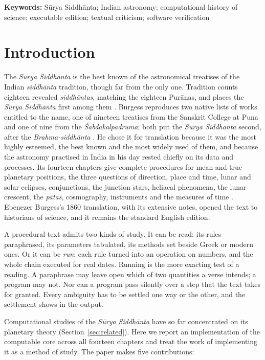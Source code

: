 \documentclass[11pt,a4paper]{article}
\newcommand{\SuSi}{\textit{S\=urya Siddh\=anta}}
\begin{document}
\noindent\textbf{Keywords:} S\=urya Siddh\=anta; Indian astronomy; computational history of science; executable edition; textual criticism; software verification

\section{Introduction}
\label{sec:intro}

The \SuSi{} is the best known of the astronomical treatises of the Indian \textit{siddh\=anta} tradition, though far from the only one. Tradition counts eighteen revealed \textit{siddh\=antas}, matching the eighteen Pur\=a\d{n}as, and places the \SuSi{} first among them \citep{sengupta1935}. Burgess reproduces two native lists of works entitled to the name, one of nineteen treatises from the Sanskrit College at Puna and one of nine from the \textit{\'Sabdakalpadruma}; both put the \SuSi{} second, after the \textit{Brahma-siddh\=anta} \citep[Appendix, note to p.\ ii]{burgess1860}. He chose it for translation because it was the most highly esteemed, the best known and the most widely used of them, and because the astronomy practised in India in his day rested chiefly on its data and processes. Its fourteen chapters give complete procedures for mean and true planetary positions, the three questions of direction, place and time, lunar and solar eclipses, conjunctions, the junction stars, heliacal phenomena, the lunar crescent, the \textit{p\=atas}, cosmography, instruments and the measures of time \citep{burgess1860,pingree1978,plofker2009}. Ebenezer Burgess's 1860 translation, with its extensive notes, opened the text to historians of science, and it remains the standard English edition.

A procedural text admits two kinds of study. It can be read: its rules paraphrased, its parameters tabulated, its methods set beside Greek or modern ones. Or it can be \emph{run}: each rule turned into an operation on numbers, and the whole chain executed for real dates. Running is the more exacting test of a reading. A paraphrase may leave open which of two quantities a verse intends; a program may not. Nor can a program pass silently over a step that the text takes for granted. Every ambiguity has to be settled one way or the other, and the settlement shows in the output.

Computational studies of the \SuSi{} have so far concentrated on its planetary theory (Section~\ref{sec:related}). Here we report an implementation of the computable core across all fourteen chapters and treat the work of implementing it as a method of study. The paper makes five contributions:
\end{document}
